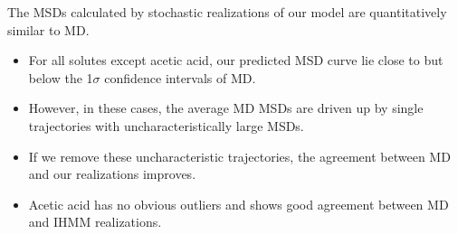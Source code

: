 \documentclass{article}
\begin{document}
  \noindent The MSDs calculated by stochastic realizations of our model are
  quantitatively similar to MD.
  \begin{itemize}
  	\item For all solutes except acetic acid, our predicted MSD curve lie close to
  	but below the 1$\sigma$ confidence intervals of MD.
  	\item However, in these cases, the average MD MSDs are driven up by single trajectories
    with uncharacteristically large MSDs.
    \item If we remove these uncharacteristic trajectories, the agreement between 
    MD and our realizations improves. 
    \item Acetic acid has no obvious outliers and shows good agreement between MD and
    IHMM realizations.
  \end{itemize}
  
\end{document}
